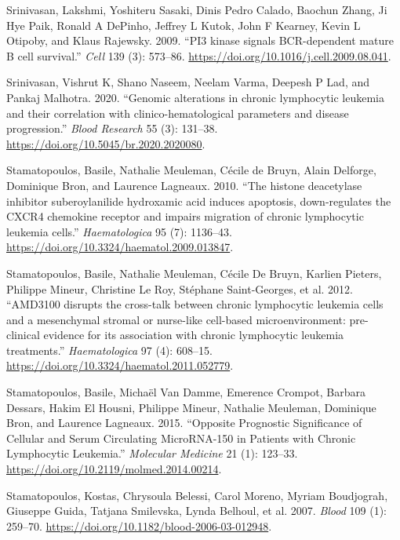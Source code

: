 \documentclass[11pt, a4paper, twosided]{book}
\newenvironment{CSLReferences}%
  {}%
  {\par}
\begin{document}
\begin{CSLReferences}{1}{0}
\leavevmode{}%
Srinivasan, Lakshmi, Yoshiteru Sasaki, Dinis Pedro Calado, Baochun Zhang, Ji Hye Paik, Ronald A DePinho, Jeffrey L Kutok, John F Kearney, Kevin L Otipoby, and Klaus Rajewsky. 2009. {``{PI3 kinase signals BCR-dependent mature B cell survival.}''} \emph{Cell} 139 (3): 573--86. \url{https://doi.org/10.1016/j.cell.2009.08.041}.

\leavevmode{}%
Srinivasan, Vishrut K, Shano Naseem, Neelam Varma, Deepesh P Lad, and Pankaj Malhotra. 2020. {``{Genomic alterations in chronic lymphocytic leukemia and their correlation with clinico-hematological parameters and disease progression}.''} \emph{Blood Research} 55 (3): 131--38. \url{https://doi.org/10.5045/br.2020.2020080}.

\leavevmode{}%
Stamatopoulos, Basile, Nathalie Meuleman, Cécile de Bruyn, Alain Delforge, Dominique Bron, and Laurence Lagneaux. 2010. {``{The histone deacetylase inhibitor suberoylanilide hydroxamic acid induces apoptosis, down-regulates the CXCR4 chemokine receptor and impairs migration of chronic lymphocytic leukemia cells}.''} \emph{Haematologica} 95 (7): 1136--43. \url{https://doi.org/10.3324/haematol.2009.013847}.

\leavevmode{}%
Stamatopoulos, Basile, Nathalie Meuleman, Cécile De Bruyn, Karlien Pieters, Philippe Mineur, Christine Le Roy, Stéphane Saint-Georges, et al. 2012. {``{AMD3100 disrupts the cross-talk between chronic lymphocytic leukemia cells and a mesenchymal stromal or nurse-like cell-based microenvironment: pre-clinical evidence for its association with chronic lymphocytic leukemia treatments.}''} \emph{Haematologica} 97 (4): 608--15. \url{https://doi.org/10.3324/haematol.2011.052779}.

\leavevmode{}%
Stamatopoulos, Basile, Michaël Van Damme, Emerence Crompot, Barbara Dessars, Hakim El Housni, Philippe Mineur, Nathalie Meuleman, Dominique Bron, and Laurence Lagneaux. 2015. {``{Opposite Prognostic Significance of Cellular and Serum Circulating MicroRNA-150 in Patients with Chronic Lymphocytic Leukemia}.''} \emph{Molecular Medicine} 21 (1): 123--33. \url{https://doi.org/10.2119/molmed.2014.00214}.

\leavevmode{}%
Stamatopoulos, Kostas, Chrysoula Belessi, Carol Moreno, Myriam Boudjograh, Giuseppe Guida, Tatjana Smilevska, Lynda Belhoul, et al. 2007. \emph{Blood} 109 (1): 259--70. \url{https://doi.org/10.1182/blood-2006-03-012948}.


\end{CSLReferences}
\end{document}
